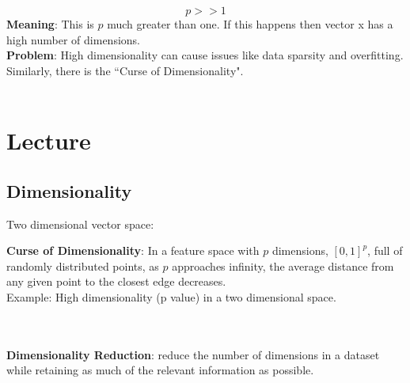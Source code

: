 \[
    p>>1
\]
\textbf{Meaning}: This is $p$ much greater than one. If this happens then vector x has a high number of dimensions. \\
\textbf{Problem}: High dimensionality can cause issues like data sparsity and overfitting. Similarly, there is the ``Curse of Dimensionality". \\\\

\section{Lecture}
\subsection{Dimensionality}

Two dimensional vector space:




\textbf{Curse of Dimensionality}: In a feature space with $p$ dimensions, $[0,1]^p$, full of randomly distributed points, as $p$ approaches infinity, the average distance from any given point to the closest edge decreases.\\

Example:  High dimensionality (p value) in a two dimensional space.\\

\\\\
\textbf{Dimensionality Reduction}: reduce the number of dimensions in a dataset while retaining as much of the relevant information as possible. \\

